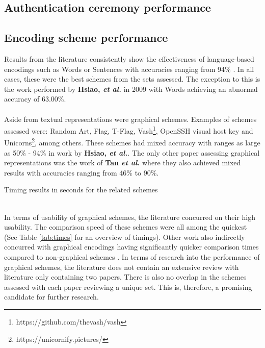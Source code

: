 \subsection{Authentication ceremony performance}

\subsection*{Encoding scheme performance}
Results 
from the literature consistently show the effectiveness of language-based encodings such as Words or Sentences with accuracies ranging from 94\% \cite{dechand2016empirical}\cite{tan2017can}\cite{kainda2009usability}. In all cases, these were the best schemes from the sets assessed. The exception to this is the work performed by \textbf{Hsiao, \textit{et al.}}\cite{hsiao2009study} in 2009 with Words achieving an abnormal accuracy of 63.00\%.
\\\\
Aside from textual representations were graphical schemes. Examples of schemes assessed were: Random Art\cite{perrig1999hash}, Flag\cite{ellison2003public}, T-Flag\cite{lin2010spate}, Vash\footnote{https://github.com/thevash/vash}, OpenSSH visual host key and Unicorns\footnote{https://unicornify.pictures/}, among others. These schemes had mixed accuracy with ranges as large as 50\% - 94\% in work by \textbf{Hsiao, \textit{et al.}}\cite{hsiao2009study}. The only other paper assessing graphical representations was the work of \textbf{Tan \textit{et al.}}\cite{tan2017can} where they also achieved mixed results with accuracies ranging from 46\% to 90\%.
\\
\begin{table}[h!]
    \makebox[\textwidth][c]{
        
    }%
    \caption{Timing results in seconds for the related schemes}
    \label{tab:times}
\end{table}
\\
In terms of usability of graphical schemes, the literature concurred on their high usability. The comparison speed of these schemes were all among the quickest (See Table \ref{tab:times} for an overview of timings). Other work also indirectly concurred with graphical encodings having significantly quicker comparison times compared to non-graphical schemes \cite{dechand2016empirical}\cite{kainda2009usability}.
In terms of research into the performance of graphical schemes, the literature does not contain an extensive review with literature only containing two papers. There is also no overlap in the schemes assessed with each paper reviewing a unique set. This is, therefore, a promising candidate for further research.


